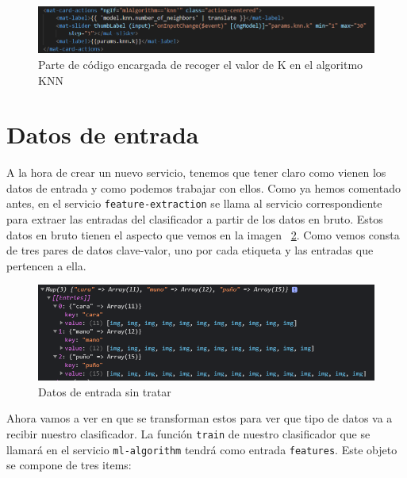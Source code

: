 \documentclass[a4paper, 12pt]{book}
\begin{document}
\begin{figure}
	\centering
	\includegraphics[width=12cm, keepaspectratio]{img/nvecinosknn}
	\caption{Parte de código encargada de recoger el valor de K en el algoritmo KNN}				
        \label{fig:nvecinosknn}
\end{figure}

\section{Datos de entrada} 
\label{sec:datosdeentrada}

A la hora de crear un nuevo servicio, tenemos que tener claro como vienen los datos de entrada y como podemos trabajar con ellos. Como ya hemos comentado antes, en el servicio \texttt{feature-extraction} se llama al servicio correspondiente para extraer las entradas del clasificador a partir de los datos en bruto. Estos datos en bruto tienen el aspecto que vemos en la imagen ~\ref{fig:datosenbruto}. Como vemos consta de tres pares de datos clave-valor, uno por cada etiqueta y las entradas que pertencen a ella.

\begin{figure}
	\centering
	\includegraphics[width=12cm, keepaspectratio]{img/datosenbruto}
	\caption{Datos de entrada sin tratar}				
	\label{fig:datosenbruto}
\end{figure}

Ahora vamos a ver en que se transforman estos para ver que tipo de datos va a recibir nuestro clasificador. La función \texttt{train} de nuestro clasificador que se llamará en el servicio \texttt{ml-algorithm} tendrá como entrada \texttt{features}. Este objeto se compone de tres items:
\end{document}
